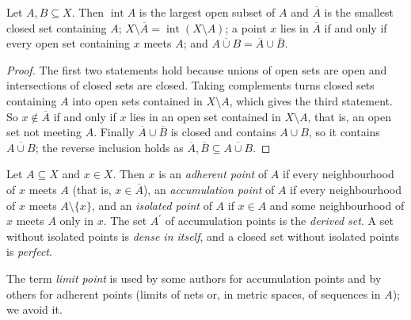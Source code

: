 \begin{lemma}\label{general-topology:lemma-closure}
Let $A, B \subseteq X$. Then $\operatorname{int} A$ is the largest open subset of $A$ and $\overline{A}$ is the smallest closed set
containing $A$; $X \setminus \overline{A} = \operatorname{int}(X \setminus A)$; a point $x$ lies in $\overline{A}$ if and only if every open
set containing $x$ meets $A$; and $\overline{A \cup B} = \overline{A} \cup \overline{B}$.
\end{lemma}

\begin{proof}
The first two statements hold because unions of open sets are open and intersections of closed sets are closed. Taking
complements turns closed sets containing $A$ into open sets contained in $X \setminus A$, which gives the third statement. So
$x \notin \overline{A}$ if and only if $x$ lies in an open set contained in $X \setminus A$, that is, an open set not meeting $A$. Finally
$\overline{A} \cup \overline{B}$ is closed and contains $A \cup B$, so it contains $\overline{A \cup B}$; the reverse inclusion holds as
$\overline{A}, \overline{B} \subseteq \overline{A \cup B}$.
\end{proof}

\begin{definition}\label{general-topology:definition-accumulation}
Let $A \subseteq X$ and $x \in X$. Then $x$ is an \emph{adherent point} of $A$ if every neighbourhood of $x$ meets $A$ (that is, $x \in \overline{A}$), an \emph{accumulation point} of $A$ if every
neighbourhood of $x$ meets $A \setminus \{x\}$, and an \emph{isolated point} of $A$ if $x \in A$ and some neighbourhood of $x$ meets $A$ only in $x$. The set $A^{\prime}$ of accumulation points is the
\emph{derived set}. A set without isolated points is \emph{dense in itself}, and a closed set without isolated points is \emph{perfect}.
\end{definition}

The term \emph{limit point} is used by some authors for accumulation points and by others for adherent points (limits of nets or, in metric spaces, of sequences in $A$); we avoid it.

